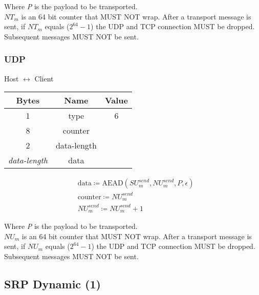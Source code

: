 Where \emph{P} is the payload to be transported.\\

$\mathit{NT}_{m}$ is an 64 bit counter that MUST NOT wrap. After a transport message is sent, if $\mathit{NT}_{m}$ equals
($2^{64}-1$) the UDP and TCP connection MUST be dropped. Subsequent messages MUST NOT be sent. \\

\subsubsection{UDP}

\begin{center}
    Host $\leftrightarrow$ Client\\
    \begin{tabular}{|c|c|c|}
        \hline
        \textbf{Bytes}     & \textbf{Name} & \textbf{Value} \\
        \hline
        1                  & type          & 6              \\
        \hline
        8                  & counter       &                \\
        \hline
        2                  & data-length   &                \\
        \hline
        \emph{data-length} & data          &                \\
        \hline
    \end{tabular}
\end{center}

\begin{align*}
    & \text{data} \coloneqq \text{AEAD}(\mathit{SU}_{m}^{send},\mathit{NU}_{m}^{send}, P, \epsilon)\\
    & \text{counter} \coloneqq \mathit{NU}_{m}^{send}\\
    & \mathit{NU}_{m}^{send} \coloneqq \mathit{NU}_{m}^{send} + 1
\end{align*}


Where \emph{P} is the payload to be transported.\\

$\mathit{NU}_{m}$ is an 64 bit counter that MUST NOT wrap. After a transport message is sent, if $\mathit{NU}_{m}$ equals
($2^{64}-1$) the UDP and TCP connection MUST be dropped. Subsequent messages MUST NOT be sent. \\

\subsection{SRP Dynamic (1)}

